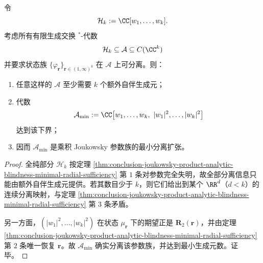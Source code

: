\begin{corollary}\label{cor:conclusion-joukowsky-product-minimal-star-algebra-resolution}
令
\[
\mathcal H_k:=\CC[w_1,\dots,w_k].
\]
考虑所有有限生成交换 \(^*\)-代数
\[
\mathcal H_k\subseteq \mathcal A\subseteq C(\CC^k)
\]
并要求状态族 \(\{\varphi_{\mathbf r}\}_{\mathbf r\in(1,\infty)^k}\) 在 \(\mathcal A\) 上可分离。则：
\begin{enumerate}
  \item 任意这样的 \(\mathcal A\) 至少需要 \(k\) 个额外自伴生成元；
  \item 代数
        \[
        \mathcal A_{\min}:=\CC\bigl[w_1,\dots,w_k,\ |w_1|^2,\dots,|w_k|^2\bigr]
        \]
        达到该下界；
  \item 因而 \(\mathcal A_{\min}\) 是乘积 Joukowsky 参数族的最小分离扩张。
\end{enumerate}
\end{corollary}

\begin{proof}
全纯部分 \(\mathcal H_k\) 按定理 \ref{thm:conclusion-joukowsky-product-analytic-blindness-minimal-radial-sufficiency} 第 \(1\) 条对参数完全失明，故全部分离信息只能由额外自伴生成元提供。若其数目少于 \(k\)，则它们给出到某个 \(\RR^d\)（\(d<k\)）的连续分离映射，与定理 \ref{thm:conclusion-joukowsky-product-analytic-blindness-minimal-radial-sufficiency} 第 \(3\) 条矛盾。

另一方面，\((|w_1|^2,\dots,|w_k|^2)\) 在状态 \(\mu_{\mathbf r}\) 下的期望正是 \(\mathbf R_2(\mathbf r)\)，并由定理 \ref{thm:conclusion-joukowsky-product-analytic-blindness-minimal-radial-sufficiency} 第 \(2\) 条唯一恢复 \(\mathbf r\)。故 \(\mathcal A_{\min}\) 确实分离该参数族，并达到最小生成元数。证毕。
\end{proof}

